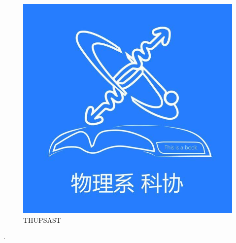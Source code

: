 \documentclass[12pt, letterpaper]{article}
\begin{document}

\begin{figure}[H] %
  \centering %
  \includegraphics[scale=0.5]{graph/logo.jpg} %
  \caption{THUPSAST} %
\end{figure}.
\end{document}

